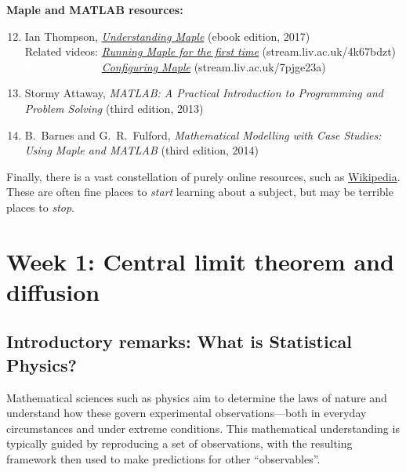 \documentclass[12 pt]{article}
\begin{document}
\noindent\textbf{Maple and MATLAB resources:} \\[-24 pt]
\begin{enumerate}
  \setcounter{enumi}{11}
  \item Ian Thompson, \href{https://library.liv.ac.uk/record=b4395758~S8}{\textit{Understanding Maple}} (ebook edition, 2017) \\
        Related videos: \href{https://stream.liv.ac.uk/4k67bdzt}{\textit{Running Maple for the first time}} (stream.liv.ac.uk/4k67bdzt) \\
        \textcolor{white}{Related videos:} \href{https://stream.liv.ac.uk/7pjge23a}{\textit{Configuring Maple}} (stream.liv.ac.uk/7pjge23a)
  \item Stormy Attaway, \textit{MATLAB: A Practical Introduction to Programming and Problem Solving} (third edition, 2013)
  \item B.~Barnes and G.~R.~Fulford, \textit{Mathematical Modelling with Case Studies: Using Maple and MATLAB} (third edition, 2014)
\end{enumerate}

Finally, there is a vast constellation of purely online resources, such as \href{https://en.wikipedia.org/wiki/Statistical_physics}{Wikipedia}.
These are often fine places to \emph{start} learning about a subject, but may be terrible places to \emph{stop}.



\newpage
\setcounter{section}{1}
\section*{Week 1: Central limit theorem and diffusion}

\subsection*{Introductory remarks: What is Statistical Physics?}
Mathematical sciences such as physics aim to determine the laws of nature and understand how these govern experimental observations---both in everyday circumstances and under extreme conditions.
This mathematical understanding is typically guided by reproducing a set of observations, with the resulting framework then used to make predictions for other ``observables''.
\end{document}

